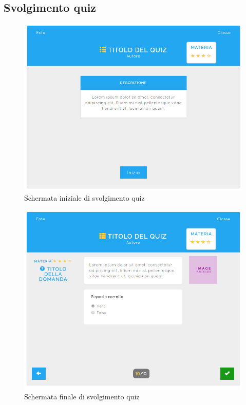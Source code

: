 \documentclass[a4paper, titlepage]{article}
\begin{document}
	 \subsection{Svolgimento quiz}
	 \begin{figure}[!h]
	 	\centering
	 	\includegraphics[scale=0.33]{Img/screen_SvolgimentoQuiz1.png}
	 	\caption{Schermata iniziale di svolgimento quiz}
	 \end{figure}
	 \begin{figure}[!h]
	 	\centering
	 	\includegraphics[scale=0.33]{Img/screen_SvolgimentoQuiz3.png}
	 	\caption{Schermata finale di svolgimento quiz}
	 \end{figure}
\end{document}
